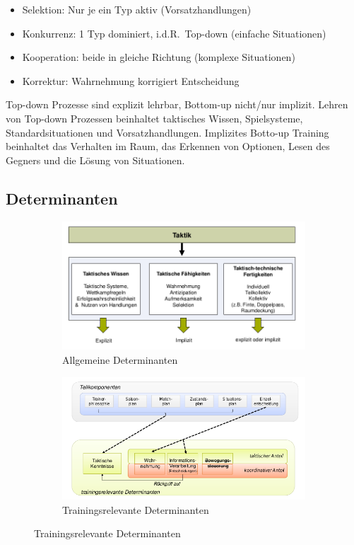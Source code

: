\begin{minipage}{0.9\textwidth}
  \begin{itemize}
    \item Selektion: Nur je ein Typ aktiv (Vorsatzhandlungen)
    \item Konkurrenz: 1 Typ dominiert, i.d.R.\ Top-down (einfache Situationen)
    \item Kooperation: beide in gleiche Richtung (komplexe Situationen)
    \item Korrektur: Wahrnehmung korrigiert Entscheidung
  \end{itemize}
\end{minipage}
Top-down Prozesse sind explizit lehrbar, Bottom-up nicht/nur implizit. Lehren von Top-down Prozessen beinhaltet taktisches Wissen, Spielsysteme, Standardsituationen und Vorsatzhandlungen. Implizites Botto-up Training beinhaltet das Verhalten im Raum, das Erkennen von Optionen, Lesen des Gegners und die Lösung von Situationen.

\subsection{Determinanten}
\begin{figure}[H]
  \centering
  \begin{subfigure}{.45\textwidth}
    \includegraphics[width=\textwidth]{pictures/taktik_determinanten.png}
    \caption{Allgemeine Determinanten}
  \end{subfigure}
  \begin{subfigure}{.45\textwidth}
    \includegraphics[width=\textwidth]{pictures/taktik_determinanten_trainingsrelevant.png}
    \caption{Trainingsrelevante Determinanten}
  \end{subfigure}
\end{figure}

